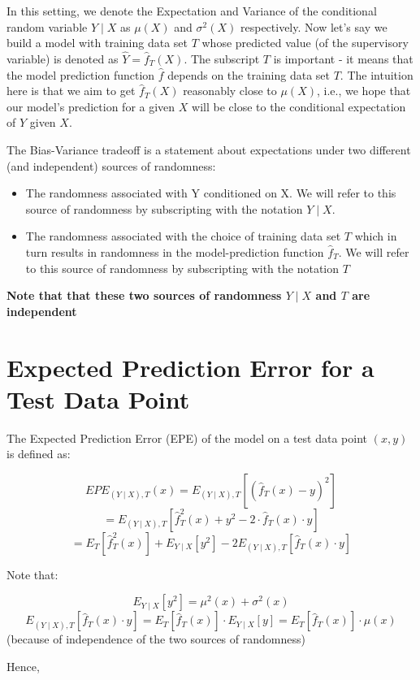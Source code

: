 \documentclass[11pt]{article}   	%
\begin{document}
In this setting, we denote the Expectation and Variance of the conditional random variable $Y \mid X$ as $\mu(X)$ and $\sigma^2(X)$ respectively. Now let's say we build a model with training data set $T$ whose predicted value (of the supervisory variable) is denoted as $\hat{Y} = \hat{f}_T(X)$. The subscript $T$ is important - it means that the model prediction function $\hat{f}$ depends on the training data set $T$. The intuition here is that we aim to get $\hat{f}_T(X)$ reasonably close to $\mu(X)$, i.e., we hope that our model's prediction for a given $X$ will be close to the conditional expectation of $Y$ given $X$.

The Bias-Variance tradeoff is a statement about expectations under two different (and independent) sources of randomness:

\begin{itemize}
\item The randomness associated with Y conditioned on X.  We will refer to this source of randomness by subscripting with the notation $Y \mid X$.
\item The randomness associated with the choice of training data set $T$ which in turn results in randomness in the model-prediction function $\hat{f}_T$. We will refer to this source of randomness by subscripting with the notation $T$
\end{itemize}

{\bf Note that that these two sources of randomness $Y \mid X$ and $T$ are independent}

\section{Expected Prediction Error for a Test Data Point}

The Expected Prediction Error (EPE) of the model on a test data point $(x, y)$ is defined as:

$$EPE_{(Y \mid X), T}(x) = E_{(Y \mid X), T} [(\hat{f}_T(x) - y)^2]$$
$$ = E_{(Y \mid X), T} [\hat{f}^2_T(x) + y^2 - 2 \cdot \hat{f}_T(x) \cdot y]$$
$$ = E_T [\hat{f}^2_T(x)] + E_{Y \mid X}[y^2] - 2 E_{(Y \mid X), T} [\hat{f}_T(x) \cdot y]$$

Note that:

$$ E_{Y \mid X}[y^2] = \mu^2(x) + \sigma^2(x)$$
$$ E_{(Y \mid X), T} [\hat{f}_T(x) \cdot y] = E_T [\hat{f}_T(x)] \cdot E_{Y \mid X} [y] = E_T [\hat{f}_T(x)] \cdot \mu(x)$$
(because of independence of the two sources of randomness)

Hence,
\end{document}
